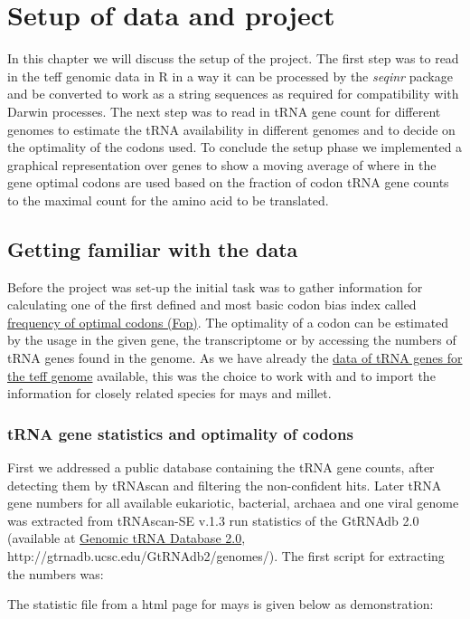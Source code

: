 \chapter{Setup of data and project}
In this chapter we will discuss the setup of the project. The first step was to read in the teff genomic data in R in a way it can be processed by the \textit{seqinr} package and be converted to work as a string sequences as required for compatibility with Darwin processes. The next step was to read in tRNA gene count for different genomes to estimate the tRNA availability in different genomes and to decide on the optimality of the codons used. To conclude the setup phase we implemented a graphical representation over genes to show a moving average of where in the gene optimal codons are used based on the fraction of codon tRNA gene counts to the maximal count for the amino acid to be translated. 

\section{Getting familiar with the data}
Before the project was set-up the initial task was to gather information for calculating one of the first defined and most basic codon bias index called \hyperlink{function:Fop}{frequency of optimal codons (Fop)}. The optimality of a codon can be estimated by the usage in the given gene, the transcriptome or by accessing the numbers of tRNA genes found in the genome. As we have already the \hyperlink{data:tRNAlist}{data of tRNA genes for the teff genome} available, this was the choice to work with and to import the information for closely related species for mays and millet.

\subsection{tRNA gene statistics and optimality of codons}
First we addressed a public database containing the tRNA gene counts, after detecting them by tRNAscan and filtering the non-confident hits. Later tRNA gene numbers for all available eukariotic, bacterial, archaea and one viral genome was extracted from tRNAscan-SE v.1.3 run statistics of the GtRNAdb 2.0 (available at
\href{http://gtrnadb.ucsc.edu/GtRNAdb2/genomes/}{Genomic tRNA Database 2.0}, http://gtrnadb.ucsc.edu/GtRNAdb2/genomes/). \cite{Chan2016} %
The first script for extracting the numbers was:
  
The statistic file from a html page for mays is given below as demonstration: 
      
 
